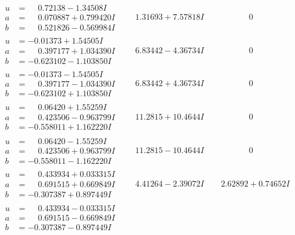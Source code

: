 \documentclass[1p]{elsarticle_modified}
\theoremstyle{definition}
\begin{document}
$$\begin{array}{c|c|c}
\begin{aligned}
u &= \phantom{-}0.72138 - 1.34508 I \\
a &= \phantom{-}0.070887 + 0.799420 I \\
b &= \phantom{-}0.521826 - 0.569984 I\end{aligned}
 & \phantom{-}1.31693 + 7.57818 I & \phantom{-0.000000 } 0 \\ \hline\begin{aligned}
u &= -0.01373 + 1.54505 I \\
a &= \phantom{-}0.397177 + 1.034390 I \\
b &= -0.623102 - 1.103850 I\end{aligned}
 & \phantom{-}6.83442 - 4.36734 I & \phantom{-0.000000 } 0 \\ \hline\begin{aligned}
u &= -0.01373 - 1.54505 I \\
a &= \phantom{-}0.397177 - 1.034390 I \\
b &= -0.623102 + 1.103850 I\end{aligned}
 & \phantom{-}6.83442 + 4.36734 I & \phantom{-0.000000 } 0 \\ \hline\begin{aligned}
u &= \phantom{-}0.06420 + 1.55259 I \\
a &= \phantom{-}0.423506 - 0.963799 I \\
b &= -0.558011 + 1.162220 I\end{aligned}
 & \phantom{-}11.2815 + 10.4644 I & \phantom{-0.000000 } 0 \\ \hline\begin{aligned}
u &= \phantom{-}0.06420 - 1.55259 I \\
a &= \phantom{-}0.423506 + 0.963799 I \\
b &= -0.558011 - 1.162220 I\end{aligned}
 & \phantom{-}11.2815 - 10.4644 I & \phantom{-0.000000 } 0 \\ \hline\begin{aligned}
u &= \phantom{-}0.433934 + 0.033315 I \\
a &= \phantom{-}0.691515 + 0.669849 I \\
b &= -0.307387 + 0.897449 I\end{aligned}
 & \phantom{-}4.41264 - 2.39072 I & \phantom{-}2.62892 + 0.74652 I \\ \hline\begin{aligned}
u &= \phantom{-}0.433934 - 0.033315 I \\
a &= \phantom{-}0.691515 - 0.669849 I \\
b &= -0.307387 - 0.897449 I\end{aligned}

\end{array}$$
\end{document}
